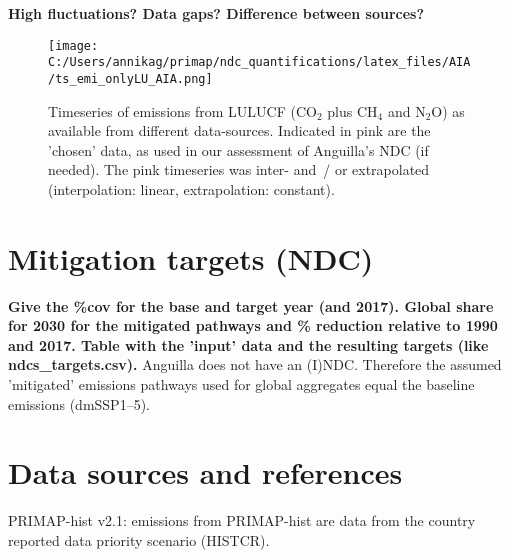 \documentclass[12pt]{article}
\begin{document}
 \textbf{High fluctuations? Data gaps? Difference between sources?}
 \begin{figure}[htbp]
 \centering
 \texttt{[image: C:/Users/annikag/primap/ndc\_quantifications/latex\_files/AIA/ts\_emi\_onlyLU\_AIA.png]}
 \caption{Timeseries of emissions from LULUCF (CO$_2$ plus CH$_4$ and N$_2$O) as available from different data-sources. 
 Indicated in pink are the 'chosen' data, as used in our assessment of Anguilla's NDC (if needed). 
 The pink timeseries was inter- and~/ or extrapolated (interpolation: linear, extrapolation: constant).}
 \label{fig:tsLULUCF}
 \end{figure}

 \section{Mitigation targets (NDC)}
 \label{sec:mitiTars}

 \textbf{ 
 Give the \%cov for the base and target year (and 2017).
 Global share for 2030 for the mitigated pathways and \% reduction relative to 1990 and 2017.
 Table with the 'input' data and the resulting targets (like ndcs\_targets.csv).}
 Anguilla does not have an (I)NDC.
 Therefore the assumed 'mitigated' emissions pathways used for global aggregates equal the baseline emissions (dmSSP1--5).

 \section{Data sources and references}
 \label{sec:dataSourcesRefs}
 PRIMAP-hist v2.1: emissions from PRIMAP-hist are data from the country reported data priority scenario (HISTCR).

 
\end{document}
